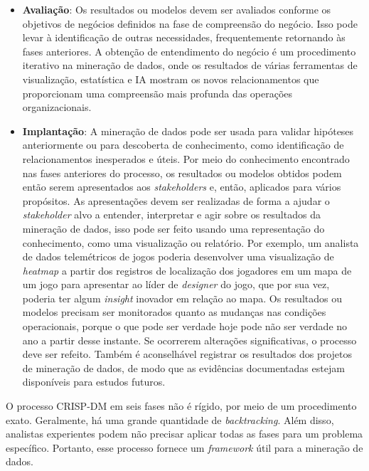 \begin{itemize}
  \item
\textbf{Avaliação}: Os resultados ou modelos devem ser avaliados conforme os objetivos de negócios definidos na fase de compreensão do negócio. Isso pode levar à identificação de outras necessidades, frequentemente retornando às fases anteriores. A obtenção de entendimento do negócio é um procedimento iterativo na mineração de dados, onde os resultados de várias ferramentas de visualização, estatística e IA mostram os novos relacionamentos que proporcionam uma compreensão mais profunda das operações organizacionais.
  \item
\textbf{Implantação}: A mineração de dados pode ser usada para validar hipóteses anteriormente  ou para descoberta de conhecimento, como identificação de relacionamentos inesperados e úteis. Por meio do conhecimento encontrado nas fases anteriores do processo, os resultados ou modelos obtidos podem então serem apresentados aos \textit{stakeholders} e, então, aplicados para vários propósitos. As apresentações devem ser realizadas de forma a ajudar o \textit{stakeholder} alvo a entender, interpretar e agir sobre os resultados da mineração de dados, isso pode ser feito usando uma representação do conhecimento, como uma visualização ou relatório. Por exemplo, um analista de dados telemétricos de jogos poderia desenvolver uma visualização de \textit{heatmap} a partir dos registros de localização dos jogadores em um mapa de um jogo para apresentar ao líder de \textit{designer} do jogo, que por sua vez, poderia ter algum \textit{insight} inovador em relação ao mapa. Os resultados ou modelos precisam ser monitorados quanto as mudanças nas condições operacionais, porque o que pode ser verdade hoje pode não ser verdade no ano a partir desse instante. Se ocorrerem alterações significativas, o processo deve ser refeito. Também é aconselhável registrar os resultados dos projetos de mineração de dados, de modo que as evidências documentadas estejam disponíveis para estudos futuros.

\end{itemize}
O processo CRISP-DM em seis fases não é rígido, por meio de um procedimento exato. Geralmente, há uma grande quantidade de \textit{backtracking}. Além disso, analistas experientes podem não precisar aplicar todas as fases para um problema específico. Portanto, esse processo fornece um \textit{framework} útil para a mineração de dados.

